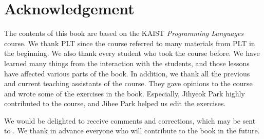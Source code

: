 \setchapterpreamble[u]{\margintoc}
\chapter{Acknowledgement}

The contents of this book are based on the KAIST \textit{Programming Languages}
course. We thank PLT since
the course referred to many materials from PLT in the beginning.
We also thank every student who took the
course before. We have learned many things from the interaction with the
students, and those lessons have affected various parts of the book. In
addition, we thank all the previous and current teaching assistants of the
course. They gave opinions to the course and wrote some of the exercises in the
book. Especially, Jihyeok Park highly contributed to the course, and Jihee Park
helped us edit the exercises.

We would be delighted to receive comments and corrections, which may be sent to
. We thank in advance everyone who will contribute
to the book in the future.
